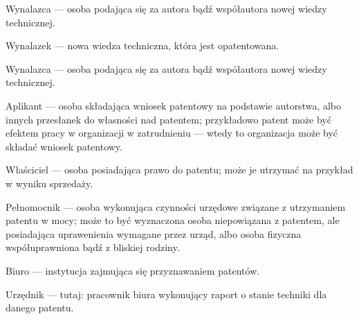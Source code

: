 \begin{defi}
Wynalazca --- osoba podająca się za autora bądź współautora nowej
wiedzy technicznej.
\end{defi}

\begin{defi}
Wynalazek --- nowa wiedza techniczna, która jest opatentowana.
\end{defi}

\begin{defi}
\label{defi:wynalazca}
Wynalazca --- osoba podająca się za autora bądź współautora nowej
wiedzy technicznej.
\end{defi}

\begin{defi}
\label{defi:aplikant}
Aplikant --- osoba składająca wniosek patentowy na podstawie autorstwa,
albo innych przesłanek do własności nad patentem; przykładowo patent
może być efektem pracy w organizacji w zatrudnieniu --- wtedy to
organizacja może być składać wniosek patentowy.
\end{defi}

\begin{defi}
Właściciel --- osoba posiadająca prawo do patentu; może je utrzymać
na przykład w wyniku sprzedaży.
\end{defi}

\begin{defi}
Pełnomocnik --- osoba wykonująca czynności urzędowe związane z
utrzymaniem patentu w mocy; może to być wyznaczona osoba niepowiązana z 
patentem, ale posiadająca uprawenienia wymagane przez urząd, albo
osoba fizyczna współuprawniona bądź z bliskiej rodziny.
\end{defi}

\begin{defi}
Biuro --- instytucja zajmująca się przyznawaniem patentów.
\end{defi}

\begin{defi}
Urzędnik --- tutaj: pracownik biura wykonujący raport o stanie
techniki dla danego patentu.
\end{defi}